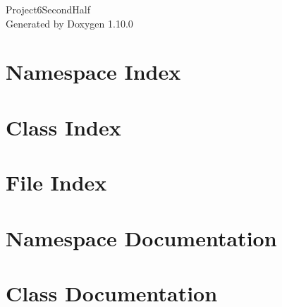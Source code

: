 \documentclass[twoside]{book}
\newcommand{\+}{\discretionary{\mbox{\scriptsize$\hookleftarrow$}}{}{}}
\newcommand{\clearemptydoublepage}{%
    \newpage{\pagestyle{empty}\cleardoublepage}%
  }
\begin{document}
  \raggedbottom
    \hypersetup{pageanchor=false,
                bookmarksnumbered=true,
                pdfencoding=unicode
               }
  \begin{titlepage}
  \vspace*{7cm}
  \begin{center}%
  {\Large Project6\+Second\+Half}\\
  \vspace*{1cm}
  {\large Generated by Doxygen 1.10.0}\\
  \end{center}
  \end{titlepage}
  \clearemptydoublepage
  \tableofcontents
  \clearemptydoublepage
  \hypersetup{pageanchor=true}
\chapter{Namespace Index}

\chapter{Class Index}

\chapter{File Index}

\chapter{Namespace Documentation}

\chapter{Class Documentation}






\end{document}
